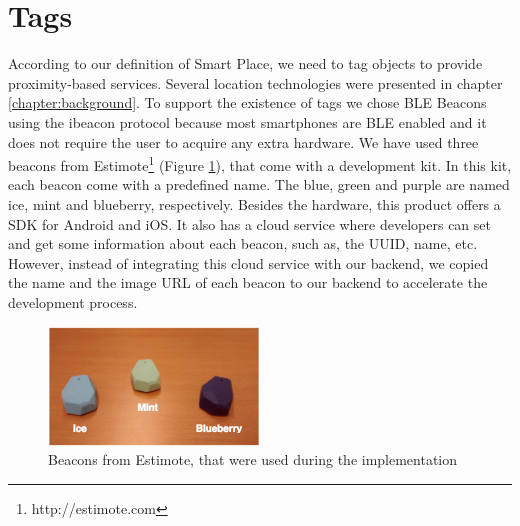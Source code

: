 \section{Tags}
\label{sec:implementation_tags}
According to our definition of Smart Place, we need to tag objects to provide proximity-based services.
Several location technologies were presented in chapter \ref{chapter:background}.
To support the existence of tags we chose \gls{BLE} Beacons using the ibeacon protocol because most smartphones are \gls{BLE} enabled and it does not require the user to acquire any extra hardware.
We have used three beacons from Estimote\footnote{http://estimote.com}
(Figure \ref{fig:estimote}), that come with a development kit.
In this kit, each beacon come with a predefined name.
The blue, green and purple are named ice, mint and blueberry, respectively.
Besides the hardware, this product offers a \gls{SDK} for Android and
iOS. It also has a cloud service where developers can set and get
some information about each beacon, such as, the \gls{UUID}, name, etc.
However, instead of integrating this cloud service with our backend, we copied the name and the image \gls{URL} of each beacon to our backend to accelerate the development process.

\begin{figure}[!ht]
  \centering
    \includegraphics[width=0.5\textwidth, keepaspectratio]{images/beacons_photo}
    \caption[Estimote beacons]{Beacons from Estimote, that were used during the implementation}
    \label{fig:estimote}
\end{figure}

\vfill

